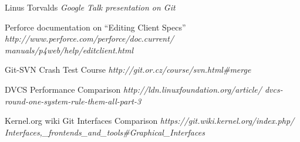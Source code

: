 \documentclass[a4paper,10pt]{article}
\begin{document}
\begin{thebibliography}{9}

Linus Torvalds \emph{Google Talk presentation on Git}

Perforce documentation on ``Editing Client Specs''
\emph{
http://www.perforce.com/perforce/doc.current/
manuals/p4web/help/editclient.html
}

Git-SVN Crash Test Course
\emph{http://git.or.cz/course/svn.html\#merge}

DVCS Performance Comparison
\emph{http://ldn.linuxfoundation.org/article/
dvcs-round-one-system-rule-them-all-part-3}

Kernel.org wiki Git Interfaces Comparison
\emph{https://git.wiki.kernel.org/index.php/
Interfaces,\_frontends\_and\_tools\#Graphical\_Interfaces}

% 
% 
% 
% 
\end{thebibliography}
\end{document}
